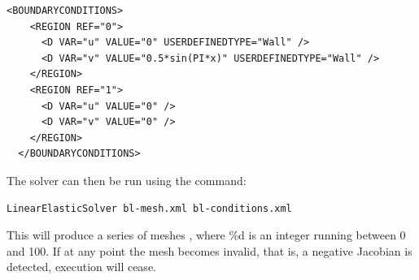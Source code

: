 \begin{lstlisting}[style=XMLStyle]
  <BOUNDARYCONDITIONS>
    <REGION REF="0">
      <D VAR="u" VALUE="0" USERDEFINEDTYPE="Wall" />
      <D VAR="v" VALUE="0.5*sin(PI*x)" USERDEFINEDTYPE="Wall" />
    </REGION>
    <REGION REF="1">
      <D VAR="u" VALUE="0" />
      <D VAR="v" VALUE="0" />
    </REGION>
  </BOUNDARYCONDITIONS>
\end{lstlisting}

The solver can then be run using the command:

\begin{lstlisting}[style=BashInputStyle]
  LinearElasticSolver bl-mesh.xml bl-conditions.xml
\end{lstlisting}

This will produce a series of meshes , where \%d is an
integer running between 0 and 100. If at any point the mesh becomes invalid,
that is, a negative Jacobian is detected, execution will cease.

